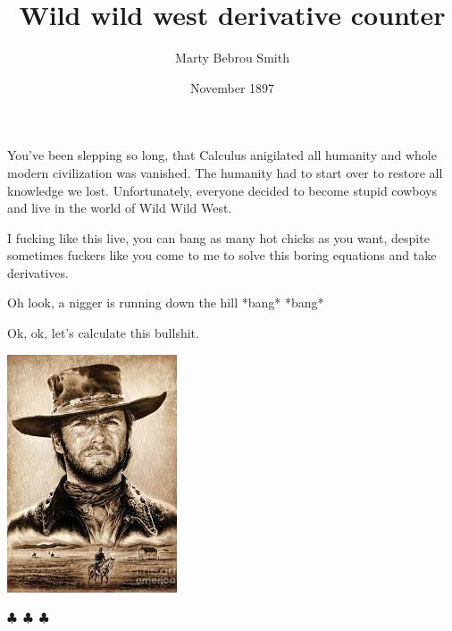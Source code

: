 \documentclass{article}
\title{Wild wild west derivative counter}
\author{Marty Bebrou Smith}
\date{November 1897}
\begin{document}
    \maketitle
    

        You've been slepping so long, that Calculus anigilated all humanity and whole modern civilization was vanished.
        The humanity had to start over to restore all knowledge we lost. Unfortunately, everyone decided to become stupid cowboys and
        live in the world of Wild Wild West.

        I fucking like this live, you can bang as many hot chicks as you want, despite sometimes fuckers like you come to me
        to solve this boring equations and take derivatives.

        Oh look, a nigger is running down the hill *bang* *bang*
        
        
        Ok, ok, let's calculate this bullshit.

        \begin{center}\begin{center} \includegraphics[scale=0.6]{funny_pics/cowboy.jpg} \end{center}\end{center}
        \begin{center}
        $\clubsuit$~$\clubsuit$~$\clubsuit$
        \end{center}
\end{document}
